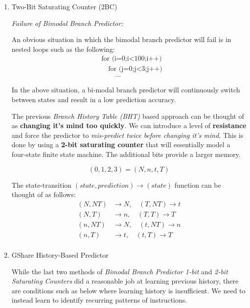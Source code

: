 \documentclass[12pt]{article}
\newenvironment{QandA}{\begin{enumerate}[label=\bfseries\arabic*.]\bfseries}
                      {\end{enumerate}}
\newenvironment{answered}{\par\quad\normalfont}{}
\begin{document}
\begin{QandA}
\item Two-Bit Saturating Counter (2BC)
\begin{answered}

\textit{Failure of Bimodal Branch Predictor:}

An obvious situation in which the bimodal branch predictor will fail is in nested loops such as the following:
\begin{equation*}
\begin{split}
    & \text{for (i=0;i$<$100;i++)} \\
    & \quad \text{for (j=0;j$<$3;j++)} \\
    & \quad \quad ...
\end{split}
\end{equation*}

In the above situation, a bi-modal branch predictor will continuously switch between states and result in a low prediction accuracy.

The previous \textit{Branch History Table (BHT)} based approach can be thought of as \textbf{changing it's mind too quickly}. We can introduce a level of \textbf{resistance} and force the predictor to \textit{mis-predict twice before changing it's mind}. This is done by using a \textbf{2-bit saturating counter} that will essentially model a four-state finite state machine. The additional bits provide a larger memory.

\begin{equation*}
    (0,1,2,3) = (N,n,t,T)
\end{equation*}

The state-transition $(state,prediction)\rightarrow(state)$ function can be thought of as follows:
\begin{equation*}
    \begin{split}
        (N, NT) & \rightarrow N , \quad (T, NT) \rightarrow t \\
        (N, T) & \rightarrow n , \quad (T, T) \rightarrow T \\
        (n, NT) & \rightarrow N , \quad (t, NT) \rightarrow n \\
        (n, T) & \rightarrow t , \quad (t, T) \rightarrow T \\
    \end{split}
\end{equation*}
\end{answered}

\item GShare History-Based Predictor
\begin{answered}
While the last two methods of \textit{Bimodal Branch Predictor 1-bit} and \textit{2-bit Saturating Counters} did a reasonable job at learning previous history, there are conditions such as below where learning history is insufficient. We need to instead learn to identify recurring patterns of instructions.


\end{answered}
\end{QandA}
\end{document}

